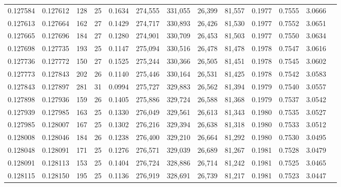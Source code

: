 \begin{tabular}{rrrrrrrrrrrrr}
0.127584 & 0.127612 & 128 &  25 &                                     0.1634 & 274,555 & 331,055 &  26,399 &  81,557 & 0.1977 & 0.7555 & 3.0666 \\
0.127613 & 0.127664 & 162 &  27 &                                     0.1429 & 274,717 & 330,893 &  26,426 &  81,530 & 0.1977 & 0.7552 & 3.0651 \\
0.127665 & 0.127696 & 184 &  27 &                                     0.1280 & 274,901 & 330,709 &  26,453 &  81,503 & 0.1977 & 0.7550 & 3.0634 \\
0.127698 & 0.127735 & 193 &  25 &                                     0.1147 & 275,094 & 330,516 &  26,478 &  81,478 & 0.1978 & 0.7547 & 3.0616 \\
0.127736 & 0.127772 & 150 &  27 &                                     0.1525 & 275,244 & 330,366 &  26,505 &  81,451 & 0.1978 & 0.7545 & 3.0602 \\
0.127773 & 0.127843 & 202 &  26 &                                     0.1140 & 275,446 & 330,164 &  26,531 &  81,425 & 0.1978 & 0.7542 & 3.0583 \\
0.127843 & 0.127897 & 281 &  31 &                                     0.0994 & 275,727 & 329,883 &  26,562 &  81,394 & 0.1979 & 0.7540 & 3.0557 \\
0.127898 & 0.127936 & 159 &  26 &                                     0.1405 & 275,886 & 329,724 &  26,588 &  81,368 & 0.1979 & 0.7537 & 3.0542 \\
0.127939 & 0.127985 & 163 &  25 &                                     0.1330 & 276,049 & 329,561 &  26,613 &  81,343 & 0.1980 & 0.7535 & 3.0527 \\
0.127985 & 0.128007 & 167 &  25 &                                     0.1302 & 276,216 & 329,394 &  26,638 &  81,318 & 0.1980 & 0.7533 & 3.0512 \\
0.128008 & 0.128046 & 184 &  26 &                                     0.1238 & 276,400 & 329,210 &  26,664 &  81,292 & 0.1980 & 0.7530 & 3.0495 \\
0.128048 & 0.128091 & 171 &  25 &                                     0.1276 & 276,571 & 329,039 &  26,689 &  81,267 & 0.1981 & 0.7528 & 3.0479 \\
0.128091 & 0.128113 & 153 &  25 &                                     0.1404 & 276,724 & 328,886 &  26,714 &  81,242 & 0.1981 & 0.7525 & 3.0465 \\
0.128115 & 0.128150 & 195 &  25 &                                     0.1136 & 276,919 & 328,691 &  26,739 &  81,217 & 0.1981 & 0.7523 & 3.0447 \\

\end{tabular}
